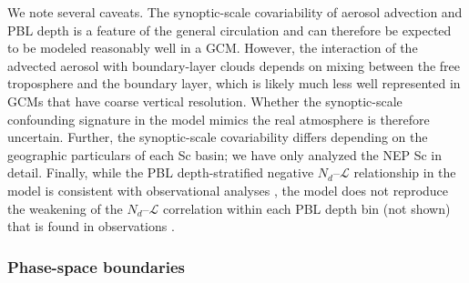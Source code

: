 \documentclass[acp, manuscript]{copernicus}\usepackage[]{graphicx}\usepackage[]{xcolor}
\newcommand\nd{\ensuremath{N_d}}
\newcommand\lwp{\ensuremath{\mathcal L}}
\begin{document}
We note several caveats.  The synoptic-scale covariability of aerosol
advection and PBL depth is a feature of the general circulation and can
therefore be expected to be  modeled reasonably well in a GCM.  However, the interaction of
the advected aerosol with boundary-layer clouds depends on mixing between the
free troposphere and the boundary layer, which is likely much less well
represented in GCMs that have coarse vertical resolution.  Whether the synoptic-scale
confounding signature in the model mimics the real atmosphere is therefore
uncertain.  Further, the synoptic-scale covariability differs depending on the
geographic particulars of each Sc basin; we have only analyzed the NEP Sc in
detail.  Finally, while the PBL depth-stratified negative \nd--\lwp{} relationship in the
model is consistent with observational analyses \citep[e.g.,][]{Fons2023}, the
model does not reproduce the weakening of the \nd--\lwp{} correlation within each PBL
depth bin (not shown) that is found in observations \citep{Possner2020,Fons2023}.

\subsubsection{Phase-space boundaries}
\label{sec:modis}
\end{document}
